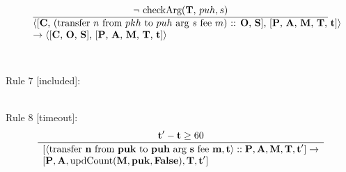 \documentclass[a4paper]{llncs}
\begin{document}
\begin{equation}{}
\frac{\text{$\neg$ checkArg(\CONTRACTORS, $puh, s$)}}{\parbox{4.2in}{\text{$\langle$[\ACCOUNTS, (transfer ${n}$ from ${pkh}$ to  ${puh}$ arg ${s}$ fee ${m}$) :: \OPERATIONS, \CONTRACTS], [\PENDING, \ACCEPTED, \MANAGERS, \CONTRACTORS, \TIME]$\rangle$}\\
\text{$\rightarrow \langle$[\ACCOUNTS, \OPERATIONS, \CONTRACTS], [\PENDING, \ACCEPTED, \MANAGERS, \CONTRACTORS, \TIME]$\rangle$}}} 
\end{equation}
~\\
~\\
Rule 7 [included]:
\begin{mathpar}
\end{mathpar}
~\\
Rule 8 [timeout]:
\begin{equation}{}
  \frac{\TIME' - \TIME \ge 60}{
    \begin{array}{l}
      {}[\langle\TRANSFER[\STRING]\NTEZ\PUK\PUH\MTEZ, \TIME\rangle ::
      \PENDING, \ACCEPTED, \MANAGERS, \CONTRACTORS, \TIME' ]
      \rightarrow \\
      {}[\PENDING, \ACCEPTED, \UPDATECOU(\MANAGERS, \PUK, \FALSE), \CONTRACTORS, \TIME']
    \end{array}
    }
\end{equation}
\end{document}
